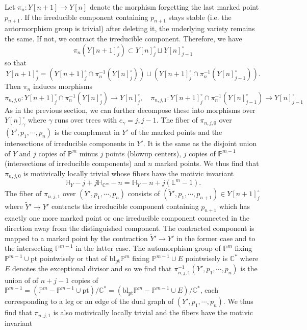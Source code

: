 \documentclass[11pt]{amsart}
\newcommand{\PP}{\mathbb{P}}
\def\CC{\mathbb{C}}
\def\LL{\mathbb{L}}
\def\lra{\longrightarrow}
\def\beq{\begin{equation}}
\def\eeq{\end{equation}}
\def\HH{\mathbb{H}}
\begin{document}
Let $\pi_n:Y[n+1]\to Y[n]$ denote the morphism forgetting the last marked point $p_{n+1}$. If the irreducible component containing $p_{n+1}$ stays stable (i.e. the autormorphism group is trivial) after deleting it, the underlying variety remains the same. If not, we contract the irreducible component. Therefore, we have   
$$\pi_n\left( Y[n+1]^\circ_j\right) \subset Y[n]^\circ_j\sqcup Y[n]^\circ_{j-1}$$
so that 
\beq\label{f2}
Y[n+1]_j^\circ=\left(Y[n+1]_j^\circ\cap \pi_n^{-1}(Y[n]^\circ_j) \right)\sqcup \left(Y[n+1]_j^\circ\cap \pi_n^{-1}(Y[n]^\circ_{j-1}) \right).
\eeq 
Then $\pi_n$ induces morphisms 
\beq\label{f16}
\pi_{n,j,0}:Y[n+1]_j^\circ\cap \pi_n^{-1}(Y[n]^\circ_j) \lra Y[n]^\circ_j, 
\quad \pi_{n,j,1}:Y[n+1]_j^\circ\cap \pi_n^{-1}(Y[n]^\circ_{j-1}) \lra Y[n]^\circ_{j-1}\eeq 
As in the previous section, we can further decompose these into morphisms over $Y[n]^\circ_\gamma$ where $\gamma$ runs over trees with $e_\gamma=j, j-1$.  
The fiber of $\pi_{n,j,0}$ over $(Y',p_1,\cdots,p_n)$ is the complement in $Y'$ of  the marked points and the intersections of irreducible components in $Y'$. It is the same as the disjoint union of $Y$ and $j$ copies of $\PP^{m}$ minus $j$ points (blowup centers), $j$ copies of $\PP^{m-1}$ (intersections of irreducible components) and $n$ marked points. 
We thus find that $\pi_{n,j,0}$ is motivically locally trivial whose fibers have the motivic invariant
\beq\label{f4}
\HH_Y-j+j\HH_{\CC^m}-n=\HH_Y-n+j(\LL^m-1).
\eeq
The fiber of $\pi_{n,j,1}$ over $(Y',p_1,\cdots,p_n)$ consists of $(\widetilde{Y}',p_1,\cdots,p_{n+1} )\in Y[n+1]_j^\circ$ 
where $\widetilde{Y}'\to Y'$ contracts the irreducible component containing $p_{n+1}$ which has exactly one more marked point or one irreducible component connected in the direction away from the distinguished component.  
The contracted component is mapped to a marked point by the contraction $\widetilde{Y}'\to Y'$ in the former case and to the intersecting $\PP^{m-1}$ in the latter case. The automorphism group of $\PP^{m}$ fixing $\PP^{m-1}\cup\mathrm{pt}$ pointwisely or that of $\mathrm{bl}_{\mathrm{pt}}\PP^m$ fixing $\PP^{m-1}\cup E$ pointwisely is $\CC^*$ where $E$ denotes the exceptional divisor and so we find that 
$\pi_{n,j,1}^{-1}(Y',p_1,\cdots,p_n)$ is the union of 
of $n+j-1$ copies of $\PP^{m-1}=(\PP^m-\PP^{m-1}\cup \mathrm{pt})/\CC^*=(\mathrm{bl}_{\mathrm{pt}}\PP^m-\PP^{m-1}\cup E)/\CC^*$, each corresponding to a leg or an edge of the dual graph of $(Y',p_1,\cdots,p_n)$. 
We thus find that $\pi_{n,j,1}$ is also motivically locally trivial and 
the fibers have the motivic invariant 
\end{document}
